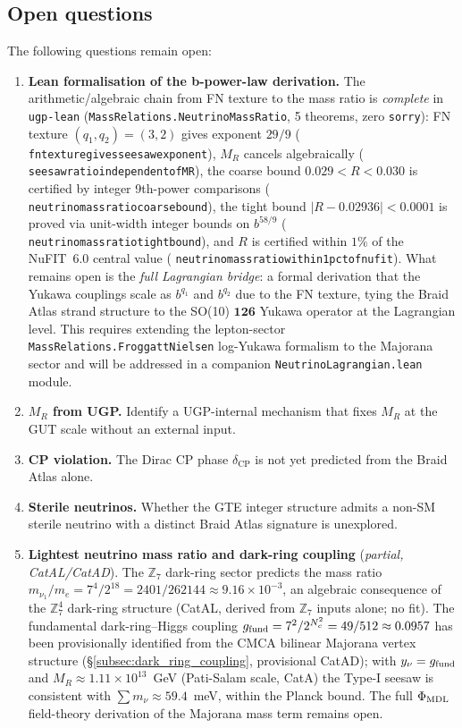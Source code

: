 \documentclass[12pt,a4paper]{article}
\theoremstyle{definition}
\theoremstyle{remark}
\newcommand{\lean}[1]{%
  \penalty-100
  \begingroup\def\_{\textunderscore\allowbreak}\texttt{#1}\endgroup}
\begin{document}
\subsection{Open questions}
\label{subsec:open}

The following questions remain open:
\begin{enumerate}[leftmargin=1.5em,itemsep=0.15em]
  \item \textbf{Lean formalisation of the b-power-law derivation.}
    The arithmetic/algebraic chain from FN texture to the mass ratio is
    \emph{complete} in \lean{ugp-lean}
    (\texttt{MassRelations.\allowbreak{}NeutrinoMassRatio}, 5 theorems, zero \lean{sorry}):
    FN texture $(q_1,q_2)=(3,2)$ gives exponent $29/9$
    (\lean{fn\_texture\_gives\_seesaw\_exponent}), $M_R$ cancels algebraically
    (\lean{seesaw\_ratio\_independent\_of\_MR}), the coarse bound
    $0.029 < R < 0.030$ is certified by integer 9th-power comparisons
    (\lean{neutrino\_mass\_ratio\_coarse\_bound}), the tight bound
    $|R - 0.02936| < 0.0001$ is proved via unit-width integer bounds on $b^{58/9}$
    (\lean{neutrino\_mass\_ratio\_tight\_bound}), and $R$ is certified within $1\%$
    of the NuFIT~6.0 central value (\lean{neutrino\_mass\_ratio\_within\_1pct\_of\_nufit}).
    What remains open is the \emph{full Lagrangian bridge}: a formal derivation
    that the Yukawa couplings scale as $b^{q_1}$ and $b^{q_2}$ due to the FN
    texture, tying the Braid Atlas strand structure to the SO(10)
    $\mathbf{126}$ Yukawa operator at the Lagrangian level.
    This requires extending the lepton-sector
    \texttt{MassRelations.FroggattNielsen} log-Yukawa formalism to the
    Majorana sector and will be addressed in a companion
    \texttt{NeutrinoLagrangian.lean} module.
  \item \textbf{$M_R$ from UGP.}  Identify a UGP-internal mechanism
    that fixes $M_R$ at the GUT scale without an external input.
  \item \textbf{CP violation.}  The Dirac CP phase $\delta_{\mathrm{CP}}$
    is not yet predicted from the Braid Atlas alone.
  \item \textbf{Sterile neutrinos.}  Whether the GTE integer structure
    admits a non-SM sterile neutrino with a distinct Braid Atlas signature
    is unexplored.
  \item \textbf{Lightest neutrino mass ratio and dark-ring coupling} (\emph{partial, CatAL/CatAD}).
    The $\mathbb{Z}_7$ dark-ring sector predicts the mass ratio
    $m_{\nu_1}/m_e = 7^4/2^{18} = 2401/262144 \approx 9.16\times10^{-3}$,
    an algebraic consequence of the $\mathbb{Z}_7^4$ dark-ring structure (CatAL,
    derived from $\mathbb{Z}_7$ inputs alone; no fit).
    The fundamental dark-ring--Higgs coupling
    $g_{\rm fund} = 7^2/2^{N_c^2} = 49/512 \approx 0.0957$
    has been provisionally identified from the CMCA bilinear Majorana vertex
    structure (\S\ref{subsec:dark_ring_coupling}, provisional CatAD);
    with $y_\nu = g_{\rm fund}$ and $M_R \approx 1.11\times10^{13}$~GeV
    (Pati-Salam scale, CatA) the Type-I seesaw is consistent with
    $\sum m_\nu \approx 59.4$~meV, within the Planck bound.
    The full $\Phi_{\rm MDL}$ field-theory derivation of the Majorana mass term remains open.
\end{enumerate}
\end{document}
